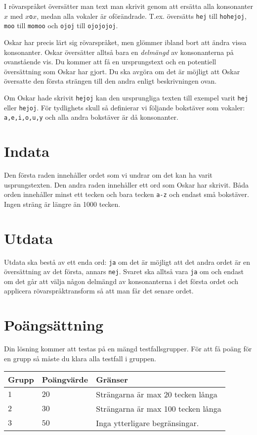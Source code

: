 I rövarspråket översätter man text man skrivit genom att ersätta alla konsonanter $x$ med $x$\texttt{o}$x$, medan alla vokaler är oförändrade.
T.ex. översätts \texttt{hej} till \texttt{hohejoj}, \texttt{moo} till \texttt{momoo} och \texttt{ojoj} till \texttt{ojojojoj}.

Oskar har precis lärt sig rövarspråket, men glömmer ibland bort att ändra vissa konsonanter. Oskar översätter alltså bara en \emph{delmängd} av konsonanterna på ovanstående vis.
Du kommer att få en ursprungstext och en potentiell översättning som Oskar har gjort. Du ska avgöra om det är möjligt att Oskar översatte den första strängen till den andra enligt beskrivningen ovan.

Om Oskar hade skrivit \texttt{hejoj} kan den ursprungliga texten till exempel varit \texttt{hej} eller \texttt{hejoj}.
För tydlighets skull så definierar vi följande bokstäver som vokaler: \texttt{a,e,i,o,u,y} och alla andra bokstäver är då konsonanter.

\section*{Indata}
Den första raden innehåller ordet som vi undrar om det kan ha varit usprungstexten. Den andra raden innehåller ett ord som Oskar har skrivit. Båda orden innehåller minst ett tecken och bara tecken \texttt{a-z} och endast små bokstäver. Ingen sträng är längre än 1000 tecken.

\section*{Utdata}
Utdata ska bestå av ett enda ord: \texttt{ja} om det är möjligt att det andra ordet är en översättning av det första, annars \texttt{nej}.
Svaret ska alltså vara \texttt{ja} om och endast om det går att välja någon delmängd av konsonanterna i det första ordet och applicera rövarspråktransform så att man får det senare ordet.

\section*{Poängsättning}
Din lösning kommer att testas på en mängd testfallsgrupper.
För att få poäng för en grupp så måste du klara alla testfall i gruppen.

\noindent
\begin{tabular}{| l | l | p{12cm} |}
  \hline
  Grupp & Poängvärde & Gränser \\ \hline
  $1$    & $20$        & Strängarna är max 20 tecken långa \\ \hline 
  $2$    & $30$        & Strängarna är max 100 tecken långa \\ \hline
  $3$    & $50$        & Inga ytterligare begränsingar. \\ \hline 
\end{tabular}

